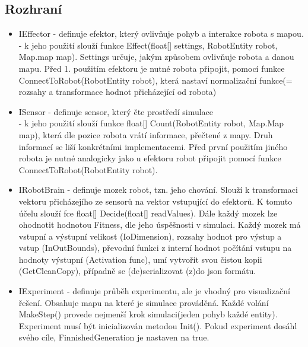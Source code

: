 \documentclass[12pt, oneside]{article}
\begin{document}
\subsection{Rozhraní}
\begin{itemize}
\item IEffector
- definuje efektor, který ovlivňuje pohyb a interakce robota s mapou. \\
- k jeho použití slouží funkce Effect(float[] settings, RobotEntity robot, Map.map map). Settings určuje, jakým způsobem ovlivňuje robota a danou mapu. Před 1. použitím efektoru je nutné robota připojit, pomocí funkce ConnectToRobot(RobotEntity robot), která nastaví normalizační funkce(= rozsahy a transformace hodnot přicházející od robota) 
\item ISensor 
- definuje sensor, který čte prostředí simulace \\
- k jeho použití slouží funkce float[] Count(RobotEntity robot, Map.Map map), která dle pozice robota vrátí informace, přečtené z mapy. Druh informací se liší konkrétními implementacemi. Před první použitím jiného robota je nutné analogicky jako u efektoru robot připojit pomocí funkce ConnectToRobot(RobotEntity robot).
\item IRobotBrain - definuje mozek robot, tzn. jeho chování. Slouží k transformaci vektoru přicházejího ze sensorů na vektor vstupující do efektorů. K tomuto účelu slouží fce float[] Decide(float[] readValues). Dále každý mozek lze ohodnotit hodnotou Fitness, dle jeho úspěšnosti v simulaci. Každý mozek má vstupní a výstupní velikost (IoDimension),  rozsahy hodnot pro výstup a vstup (InOutBounds), převodní funkci z interní hodnot počítání vstupu na hodnoty výstupní (Activation func), umí vytvořit svou čistou kopii (GetCleanCopy), případně se (de)serializovat (z)do json formátu. 
\item IExperiment - definuje průběh experimentu, ale je vhodný pro visualizační řešení. Obsahuje mapu na které je simulace prováděná. Každé volání MakeStep() provede nejmenší krok simulaci(jeden pohyb každé entity). Experiment musí být inicializován metodou Init(). Pokud experiment dosáhl svého cíle, FinnishedGeneration je nastaven na true. 
\end{itemize}
\newpage
\end{document}

